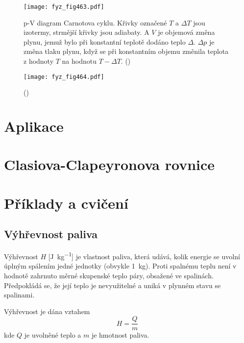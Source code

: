     \begin{figure}[ht!] %
      \centering
      \texttt{[image: fyz\_fig463.pdf]}
      \caption{p-V diagram Carnotova cyklu. Křivky označené \(T\) a \(\Delta T\) jsou izotermy,
               strmější křivky jsou adiabaty. A \(V\) je objemová změna plynu, jemuž bylo při
               konstantní teplotě dodáno teplo \(\Delta\). \(\Delta p\) je změna tlaku plynu, když
               se při konstantním objemu změnila teplota z hodnoty \(T\) na hodnotu \(T - \Delta
               T\). (\cite[s.~615]{Feynman01})}
      \label{fyz:fig463}
    \end{figure}

    \begin{figure}[ht!] %
      \centering
      \texttt{[image: fyz\_fig464.pdf]}
      \caption{ 
               (\cite[s.~616]{Feynman01})}
      \label{fyz:fig464}
    \end{figure}

  \section{Aplikace}\label{fyz:IchapXLVsecII}
  \section{Clasiova-Clapeyronova rovnice}\label{fyz:IchapXLVsecIII}
  \section{Příklady a cvičení}\label{fyz:IchapXLVsecIV}
    \subsection{Výhřevnost paliva}\label{fyz:IchapXLVsecIVssecI}
      Výhřevnost \(H\) [\si{\joule\per\kg}] je vlastnost paliva, která udává, kolik energie se
      uvolní úplným spálením jedné jednotky (obvykle \SI{1}{\kg}). Proti spalnému teplu není v
      hodnotě zahrnuto měrné skupenské teplo páry, obsažené ve spalinách. Předpokládá se, že její
      teplo je nevyužitelné a uniká v plynném stavu se spalinami.

      Výhřevnost je dána vztahem
      \begin{equation*}
        H=\dfrac{Q}{m}
      \end{equation*}
      kde \(Q\) je uvolněné teplo a \(m\) je hmotnost paliva. 

